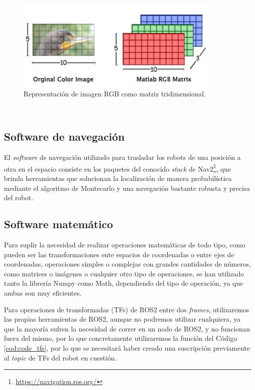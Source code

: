 \begin{figure} [h!]
  \begin{center}
    \includegraphics[width=10cm]{figs/rgb_matrix}
  \end{center}
  \caption{Representación de imagen RGB como matriz tridimensional.}
  \label{fig:imagen_matriz}
\end{figure}\


\subsection{Software de navegación}
\label{sec:navegacion}

El \textit{software} de navegación utilizado para trasladar los robots de una
posición a otra en el espacio consiste en los paquetes del conocido
\textit{stack} de Nav2\footnote{\url{https://navigation.ros.org/}}, que brinda
herramientas que solucionan la localización de manera probabilística mediante el
algoritmo de Montecarlo y una navegación bastante robusta y precisa del robot.

\subsection{Software matemático}
\label{sec:software_matematico}

Para suplir la necesidad de realizar operaciones matemáticas de todo tipo, como
pueden ser las transformaciones ente espacios de coordenadas o entre ejes de
coordenadas, operaciones simples o complejas con grandes cantidades de números,
como matrices o imágenes o cualquier otro tipo de operaciones, se han utilizado
tanto la librería Numpy como Math, dependiendo del tipo de operación, ya que
ambas son muy eficientes.

Para operaciones de transformadas (TFs) de ROS2 entre dos \textit{frames},
utilizaremos las propias herramientas de ROS2, aunque no podremos utilizar
cualquiera, ya que la mayoría sufren la necesidad de correr en un nodo de ROS2,
y no funcionan fuera del mismo, por lo que concretamente utilizaremos la
función del Código \ref{cod:code_tfs}, por lo que se necesitará haber creado una
suscripción previamente al \textit{topic} de TFs del robot en cuestión.

